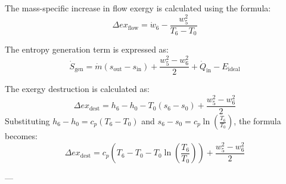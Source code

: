 The mass-specific increase in flow exergy is calculated using the formula:  
\[
\Delta ex_{\text{flow}} = \dot{w}_6 - \frac{w_5^2}{T_6 - T_0}
\]  

The entropy generation term is expressed as:  
\[
\dot{S}_{\text{gen}} = \dot{m} \left( s_{\text{out}} - s_{\text{in}} \right) + \frac{w_5^2 - w_6^2}{2} + \dot{Q}_{\text{in}} - E_{\text{ideal}}
\]  

The exergy destruction is calculated as:  
\[
\Delta ex_{\text{dest}} = h_6 - h_0 - T_0 (s_6 - s_0) + \frac{w_5^2 - w_6^2}{2}
\]  
Substituting \( h_6 - h_0 = c_p (T_6 - T_0) \) and \( s_6 - s_0 = c_p \ln \left( \frac{T_6}{T_0} \right) \), the formula becomes:  
\[
\Delta ex_{\text{dest}} = c_p (T_6 - T_0 - T_0 \ln \left( \frac{T_6}{T_0} \right)) + \frac{w_5^2 - w_6^2}{2}
\]  

---